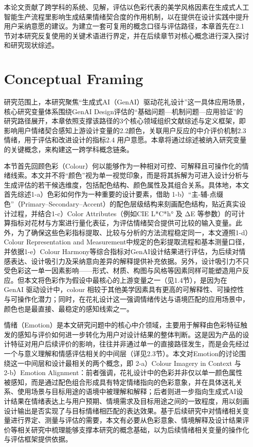 本论文贡献了跨学科的系统、见解，评估以色彩代表的美学风格因素在生成式人工智能生产流程里影响生成结果情绪契合度的作用机制，以在提供在设计实践中提升用户采纳意愿的建议。为建立一套可复用的概念口径与评估路径，本章首先在2.1节对本研究反复使用的关键术语进行界定，并在后续章节对核心概念进行深入探讨和研究现状综述。

\section{Conceptual Framing}

研究范围上，本研究聚焦“生成式AI（GenAI）驱动花礼设计”这一具体应用场景，核心研究变量体系围绕GenAI Design评估的“基础问题—机制问题—应用验证”的研究路径展开，本章依照支撑该路径的3个核心领域组织文献综述与定义框架，即影响用户情绪契合感知上游设计变量的2.2颜色，关联用户反应的中介评价机制2.3 情绪，用于评估和改进设计的指标2.4 用户意愿。本章将通过综述被纳入研究变量的关键概念，来构建这一跨学科概念链条。

本节首先回顾色彩（Colour）何以能够作为一种相对可控、可解释且可操作化的情绪线索。本文并不将“颜色”视为单一视觉印象，而是将其拆解为可进入设计分析与生成评估的若干候选维度，包括配色结构、颜色属性及其组合关系。具体地，本文首先综述1-a）色彩如何作为一种重要的设计要素，借助 1-b）“主-辅-点缀色”（Primary–Secondary–Accent）的配色层级结构来刻画配色结构，贴近真实设计过程，并结合1-c）Color Attributes（例如CIE L*C*h° 及 ΔE 等参数）的可计算指标对花材与方案进行量化表征，为评估情绪契合提供可比较的输入变量。此外，为了确保这些色彩指标提取、比较与分析的方法流程稳定同一，本文遵照1-d）Colour Representation and Measurement中规定的色彩提取流程和基本测量口径，并依据1-e）Colour Harmony等综合指标对GenAI设计结果进行评估，为后续对情感表达、设计吸引力及采纳意向差异的解释提供补充依据。另外，设计吸引力不只受色彩这一单一因素影响——形式、材质、构图与风格等因素同样可能塑造用户反应。但本文将色彩作为假设中最核心的上游变量之一（见1.4节），是因为在 GenAI 驱动设计中，colour 相较于其他美学因素具有更高的可解释性、可操控性与可操作化潜力；同时，在花礼设计这一强调情绪传达与语境匹配的应用场景中，颜色也是最直接、最稳定的感知线索之一。

情绪（Emotion）是本文研究问题中的核心中介领域，主要用于解释由色彩特征触发的感知与评价如何进一步转化为用户对设计结果的整体判断。这是因为产品的设计特征对用户后续评价的影响，往往并非通过单一的直接路径发生，而是会先经过一个与意义理解和情感评估相关的中间层（详见2.3节）。本文对Emotion的讨论围绕这一中间层和设计最相关的两个概念，即 2-a）Colour Imagery in Context 与 2-b）Emotion Alignment：前者强调，花礼设计中的色彩并非仅以单一颜色属性被感知，而是通过配色组合形成具有特定情绪指向的色彩意象，并在具体送礼关系、使用场景与目标用途的语境中被理解和解释；后者则进一步指向生成式AI设计结果在情绪表达上与用户预期、情境需求及目标用途之间的一致程度，用以刻画设计输出是否实现了与目标情绪相匹配的表达效果。基于后续研究中对情绪相关变量进行界定、测量与评估的需要，本文有必要从色彩意象、情境解释及设计结果评价等相关研究中梳理能够支撑本研究的概念基础，以为后续情绪相关变量的操作化与评估框架提供依据。

